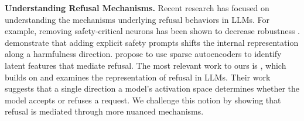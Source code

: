 \textbf{Understanding Refusal Mechanisms.} Recent research has focused on understanding the mechanisms underlying refusal behaviors in LLMs. For example, removing safety-critical neurons has been shown to decrease robustness \cite{wei2024assessingbrittlenesssafetyalignment, li2024revisitingjailbreakinglargelanguage}. %
\citet{zheng_prompt-driven_2024} demonstrate that adding explicit safety prompts shifts the internal representation along a harmfulness direction.
\citet{obrien2024steeringlanguagemodelrefusal} propose to use sparse autoencoders to identify latent features that mediate refusal. The most relevant work to ours is \citet{arditi2024refusallanguagemodelsmediated}, which builds on \citet{zou_representation_2023} and examines the representation of refusal in LLMs. Their work suggests that a single direction a model's activation space determines whether the model accepts or refuses a request. We challenge this notion by showing that refusal is mediated through more nuanced mechanisms. %


